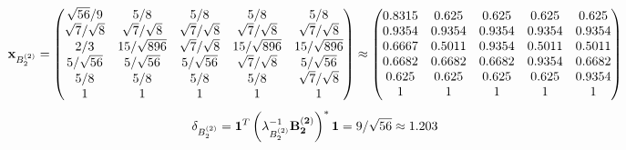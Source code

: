 \documentclass[10pt,a4paper]{article}
\begin{document}
	\[
		\bold{x}_{B_2^{(2)}} = 
		\begin{pmatrix}
			{\sqrt{56}} / {{9}} & {{5}} / {{8}} & {{5}} / {{8}} & {{5}} / {{8}} & {{5}} / {{8}} \\
			{\sqrt{7}} / {\sqrt{8}} & {\sqrt{7}} / {\sqrt{8}} & {\sqrt{7}} / {\sqrt{8}} & {\sqrt{7}} / {\sqrt{8}} & {\sqrt{7}} / {\sqrt{8}} \\
			{{2}} / {{3}} & {{15}} / {\sqrt{896}} & {\sqrt{7}} / {\sqrt{8}} & {{15}} / {\sqrt{896}} & {{15}} / {\sqrt{896}} \\
			{{5}} / {\sqrt{56}} & {{5}} / {\sqrt{56}} & {{5}} / {\sqrt{56}} & {\sqrt{7}} / {\sqrt{8}} & {{5}} / {\sqrt{56}} \\
			{{5}} / {{8}} & {{5}} / {{8}} & {{5}} / {{8}} & {{5}} / {{8}} & {\sqrt{7}} / {\sqrt{8}} \\
			{1}{} & {1}{} & {1}{} & {1}{} & {1}{} \\
		\end{pmatrix}
		\approx
		\begin{pmatrix}
			0.8315   & 0.625    & 0.625    & 0.625    & 0.625    \\
			0.9354   & 0.9354   & 0.9354   & 0.9354   & 0.9354   \\
			0.6667   & 0.5011   & 0.9354   & 0.5011   & 0.5011   \\
			0.6682   & 0.6682   & 0.6682   & 0.9354   & 0.6682   \\
			0.625    & 0.625    & 0.625    & 0.625    & 0.9354   \\
			1        & 1        & 1        & 1        & 1        \\
		\end{pmatrix}
	\]
	\[
		\delta_{B_2^{(2)}} = \bold{1}^T \left(\lambda_{B_2^{(2)}}^{-1}\bold{B_2^{(2)}}\right)^* \bold{1} = {{9}} / {\sqrt{56}}\approx 1.203
	\]
\end{document}
